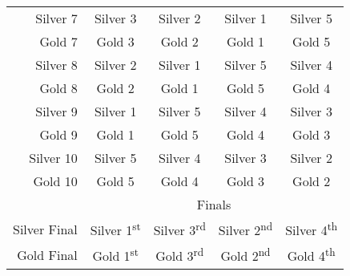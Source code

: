 \begin{tabular}{r | c c c c}
    Silver 7 & Silver 3 & Silver 2 & Silver 1 & Silver 5 \\
    Gold 7 & Gold 3 & Gold 2 & Gold 1 & Gold 5 \\
    Silver 8 & Silver 2 & Silver 1 & Silver 5 & Silver 4 \\
    Gold 8 & Gold 2 & Gold 1 & Gold 5 & Gold 4 \\
    Silver 9 & Silver 1 & Silver 5 & Silver 4 & Silver 3 \\
    Gold 9 & Gold 1 & Gold 5 & Gold 4 & Gold 3 \\
    Silver 10 & Silver 5 & Silver 4 & Silver 3 & Silver 2 \\
    Gold 10 & Gold 5 & Gold 4 & Gold 3 & Gold 2 \\
    & \multicolumn{4}{|c}{Finals} \\
    Silver Final & Silver 1\textsuperscript{st} & Silver 3\textsuperscript{rd} & Silver 2\textsuperscript{nd} & Silver 4\textsuperscript{th} \\
    Gold Final & Gold 1\textsuperscript{st} & Gold 3\textsuperscript{rd} & Gold 2\textsuperscript{nd} & Gold 4\textsuperscript{th} \\
\end{tabular}

